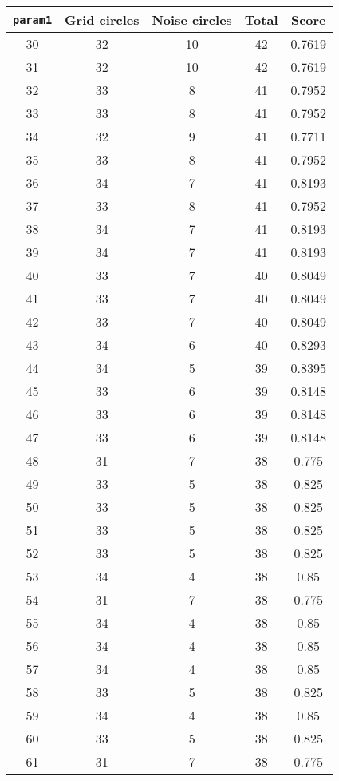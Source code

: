 \documentclass[letterpaper, 12pt]{article}
\begin{document}
\begin{longtable}{|c|c|c|c|c|}
\hline
\textbf{\texttt{param1}} & \textbf{Grid circles} & \textbf{Noise circles} & \textbf{Total} & \textbf{Score} \\
\hline
30 & 32 & 10 & 42 & 0.7619 \\
\hline
31 & 32 & 10 & 42 & 0.7619 \\
\hline
32 & 33 & 8 & 41 & 0.7952 \\
\hline
33 & 33 & 8 & 41 & 0.7952 \\
\hline
34 & 32 & 9 & 41 & 0.7711 \\
\hline
35 & 33 & 8 & 41 & 0.7952 \\
\hline
36 & 34 & 7 & 41 & 0.8193 \\
\hline
37 & 33 & 8 & 41 & 0.7952 \\
\hline
38 & 34 & 7 & 41 & 0.8193 \\
\hline
39 & 34 & 7 & 41 & 0.8193 \\
\hline
40 & 33 & 7 & 40 & 0.8049 \\
\hline
41 & 33 & 7 & 40 & 0.8049 \\
\hline
42 & 33 & 7 & 40 & 0.8049 \\
\hline
43 & 34 & 6 & 40 & 0.8293 \\
\hline
44 & 34 & 5 & 39 & 0.8395 \\
\hline
45 & 33 & 6 & 39 & 0.8148 \\
\hline
46 & 33 & 6 & 39 & 0.8148 \\
\hline
47 & 33 & 6 & 39 & 0.8148 \\
\hline
48 & 31 & 7 & 38 & 0.775 \\
\hline
49 & 33 & 5 & 38 & 0.825 \\
\hline
50 & 33 & 5 & 38 & 0.825 \\
\hline
51 & 33 & 5 & 38 & 0.825 \\
\hline
52 & 33 & 5 & 38 & 0.825 \\
\hline
53 & 34 & 4 & 38 & 0.85 \\
\hline
54 & 31 & 7 & 38 & 0.775 \\
\hline
55 & 34 & 4 & 38 & 0.85 \\
\hline
56 & 34 & 4 & 38 & 0.85 \\
\hline
57 & 34 & 4 & 38 & 0.85 \\
\hline
58 & 33 & 5 & 38 & 0.825 \\
\hline
59 & 34 & 4 & 38 & 0.85 \\
\hline
60 & 33 & 5 & 38 & 0.825 \\
\hline
61 & 31 & 7 & 38 & 0.775 \\

\end{longtable}
\end{document}
